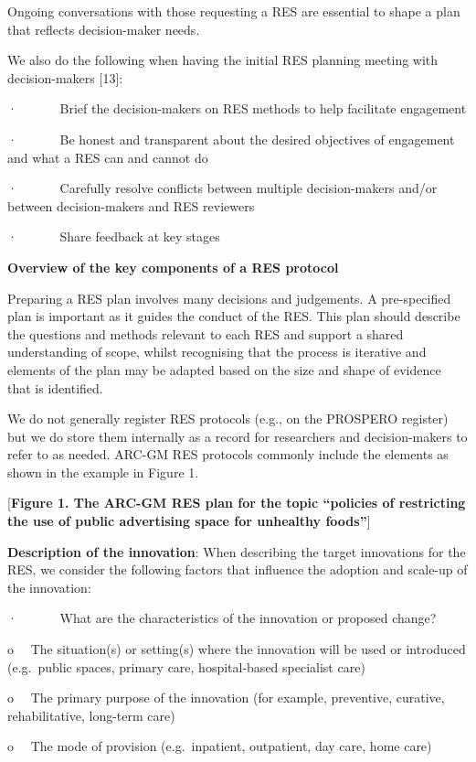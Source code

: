 \documentclass[
  letterpaper,
  DIV=11,
  numbers=noendperiod]{scrreprt}
\begin{document}
Ongoing conversations with those requesting a RES are essential to shape
a plan that reflects decision-maker needs.

We also do the following when having the initial RES planning meeting
with decision-makers {[}13{]}:

·~~~~~~ Brief the decision-makers on RES methods to help facilitate
engagement

·~~~~~~ Be honest and transparent about the desired objectives of
engagement and what a RES can and cannot do

·~~~~~~ Carefully resolve conflicts between multiple decision-makers
and/or between decision-makers and RES reviewers

·~~~~~~ Share feedback at key stages

\textbf{Overview of the key components of a RES protocol}

Preparing a RES plan involves many decisions and judgements. A
pre-specified plan is important as it guides the conduct of the RES.
This plan should describe the questions and methods relevant to each RES
and support a shared understanding of scope, whilst recognising that the
process is iterative and elements of the plan may be adapted based on
the size and shape of evidence that is identified.

We do not generally register RES protocols (e.g., on the PROSPERO
register) but we do store them internally as a record for researchers
and decision-makers to refer to as needed. ARC-GM RES protocols commonly
include the elements as shown in the example in Figure 1.

{[}\textbf{Figure 1. The ARC-GM RES plan for the topic ``policies of
restricting the use of public advertising space for unhealthy
foods''}{]}

\textbf{Description of the innovation}: When describing the target
innovations for the RES, we consider the following factors that
influence the adoption and scale-up of the innovation:

·~~~~~~ What are the characteristics of the innovation or proposed
change?

o~~ The situation(s) or setting(s) where the innovation will be used or
introduced (e.g.~public spaces, primary care, hospital-based specialist
care)

o~~ The primary purpose of the innovation (for example, preventive,
curative, rehabilitative, long-term care)

o~~ The mode of provision (e.g.~inpatient, outpatient, day care, home
care)
\end{document}
